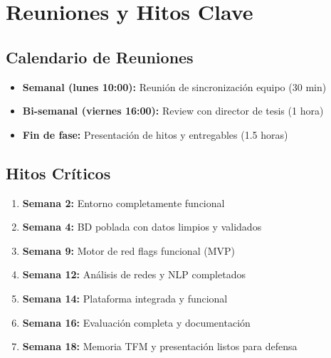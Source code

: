 \documentclass[11pt,a4paper,spanish]{book}
\numberwithin{equation}{chapter}
\numberwithin{figure}{chapter}
\begin{document}
\chapter{Reuniones y Hitos Clave}

\section{Calendario de Reuniones}

\begin{itemize}
\item \textbf{Semanal (lunes 10:00):} Reunión de sincronización equipo (30 min)
\item \textbf{Bi-semanal (viernes 16:00):} Review con director de tesis (1 hora)
\item \textbf{Fin de fase:} Presentación de hitos y entregables (1.5 horas)
\end{itemize}

\section{Hitos Críticos}

\begin{enumerate}
\item \textbf{Semana 2:} Entorno completamente funcional
\item \textbf{Semana 4:} BD poblada con datos limpios y validados
\item \textbf{Semana 9:} Motor de red flags funcional (MVP)
\item \textbf{Semana 12:} Análisis de redes y NLP completados
\item \textbf{Semana 14:} Plataforma integrada y funcional
\item \textbf{Semana 16:} Evaluación completa y documentación
\item \textbf{Semana 18:} Memoria TFM y presentación listos para defensa
\end{enumerate}
\end{document}
